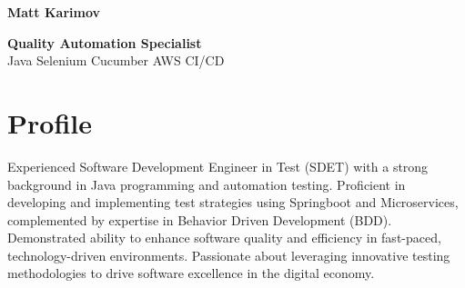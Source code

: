 \documentclass[11pt,a4paper]{article}
\begin{document}
    \begin{center}
        \textbf{\LARGE Matt Karimov} \\
        {\small \address{Manchester, UK} \textbar{}
         \textbar{}
         \textbar{}
         \textbar{}
        }

        {\Large \textbf{Quality Automation Specialist}}\\
        \small Java \textbar{} Selenium \textbar{} Cucumber \textbar{} AWS \textbar{} CI/CD
    \end{center}

    \section*{Profile}
    Experienced Software Development Engineer in Test (SDET) with a strong background in Java programming and automation testing. Proficient in developing and implementing test strategies using Springboot and Microservices, complemented by expertise in Behavior Driven Development (BDD). Demonstrated ability to enhance software quality and efficiency in fast-paced, technology-driven environments. Passionate about leveraging innovative testing methodologies to drive software excellence in the digital economy.
\end{document}
